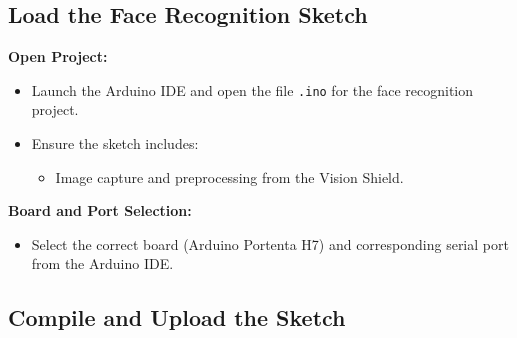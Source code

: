 \subsection{Load the Face Recognition Sketch}

\textbf{Open Project:}  
\begin{itemize}[leftmargin=1.5cm]
	\item Launch the Arduino IDE and open the file \texttt{.ino} for the face recognition project.
	\item Ensure the sketch includes:
	\begin{itemize}
		\item Image capture and preprocessing from the Vision Shield.
	\end{itemize}
\end{itemize}

\textbf{Board and Port Selection:}  
\begin{itemize}[leftmargin=1.5cm]
	\item Select the correct board (Arduino Portenta H7) and corresponding serial port from the Arduino IDE.
\end{itemize}

\subsection{Compile and Upload the Sketch}

